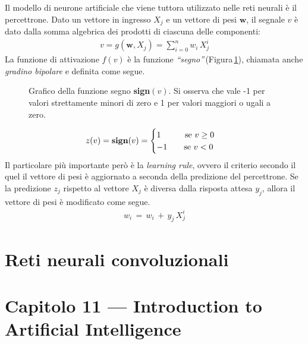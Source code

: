 Il modello di neurone artificiale che viene tuttora utilizzato nelle reti neurali è il percettrone. Dato un vettore in ingresso $X_j$ e un vettore di pesi $\mathbf{w}$, il segnale $v$ è dato dalla somma algebrica dei prodotti di ciascuna delle componenti:
% 
\begin{gather*}
    v = g\left(\mathbf{w}, X_j\right) = \sum_{i = 0}^n w_i\,X_j^i
\end{gather*}
% 
\noindent La funzione di attivazione $f(v)$ è la funzione \textsl{``segno''}\,(Figura\,\ref{fig:sign-function}), chiamata anche \textsl{gradino bipolare} e definita come segue. 
% 
\begin{figure}[!b]
    \centering
    
    \caption[Grafico della funzione segno \textsl{sign}$(v)$.]{Grafico della funzione segno \textbf{sign}$(v)$. Si osserva che vale -1 per valori strettamente minori di zero e 1 per valori maggiori o ugali a zero.}\label{fig:sign-function}
\end{figure}
% 
\begin{gather*}
    z(v) = \text{\textbf{sign}}(v) =
    \begin{cases}
        1 \hspace{29px} \text{se } v\geq0\\
        -1 \hspace{20px} \text{se } v<0
    \end{cases}
\end{gather*}
% 
\noindent Il particolare più importante però è la \textit{learning rule}, ovvero il criterio secondo il quel il vettore di pesi è aggiornato a seconda della predizione del percettrone. Se la predizione $z_j$ rispetto al vettore $X_j$ è diversa dalla risposta attesa $y_j$, allora il vettore di pesi è modificato come segue.
% 
\begin{gather*}
    w_i \, = \, w_i \, + \, y_j\,X_j^i
\end{gather*}

\noindent



\section{Reti neurali convoluzionali}
% 

\section*{Capitolo 11 — Introduction to Artificial Intelligence}

